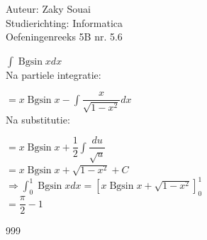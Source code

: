 \documentclass[a4paper]{article}
\newcommand{\Bgsin}{\operatorname{Bgsin}}
\begin{document}
  
\noindent \large Auteur: Zaky Souai \\
\noindent \large Studierichting:  Informatica\\
\noindent \large Oefeningenreeks 5B nr. 5.6\\

\bigskip

\normalsize

$\displaystyle \int \Bgsin x dx$ \\

Na partiele integratie:

$= x \Bgsin x - \displaystyle \int \dfrac{x}{\sqrt{1 - x^2}} dx$ \\

Na substitutie:

$= x \Bgsin x + \dfrac{1}{2} \displaystyle \int \dfrac{du}{\sqrt{u}}$ \\

$= x \Bgsin x + \sqrt{1 - x^2} + C$ \\

$\Rightarrow \displaystyle \int_0^{1} \Bgsin x  dx = \left[x \Bgsin x + \sqrt{1 - x^2} \right]_0^1$ \\

$= \dfrac{\pi}{2} - 1$ \\

\begin{thebibliography}{999}
\end{thebibliography}
\end{document}

